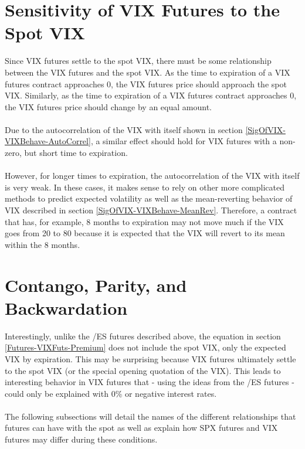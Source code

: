 \documentclass[11pt, oneside]{book}
\begin{document}
\section{Sensitivity of VIX Futures to the Spot VIX} \label{Futures-Sensitivity}
Since VIX futures settle to the spot VIX, there must be some relationship between the VIX futures and the spot VIX. As the time to expiration of a VIX futures contract approaches 0, the VIX futures price should approach the spot VIX. Similarly, as the time to expiration of a VIX futures contract approaches 0, the VIX futures price should change by an equal amount.\\
\\
Due to the autocorrelation of the VIX with itself shown in section \ref{SigOfVIX-VIXBehave-AutoCorrel}, a similar effect should hold for VIX futures with a non-zero, but short time to expiration.\\
\\
However, for longer times to expiration, the autocorrelation of the VIX with itself is very weak. In these cases, it makes sense to rely on other more complicated methods to predict expected volatility as well as the mean-reverting behavior of VIX described in section \ref{SigOfVIX-VIXBehave-MeanRev}. Therefore, a contract that has, for example, 8 months to expiration may not move much if the VIX goes from 20 to 80 because it is expected that the VIX will revert to its mean within the 8 months.

\section{Contango, Parity, and Backwardation} \label{Futures-ConBackPar}
Interestingly, unlike the /ES futures described above, the equation in section \ref{Futures-VIXFuts-Premium} does not include the spot VIX, only the expected VIX by expiration. This may be surprising because VIX futures ultimately settle to the spot VIX (or the special opening quotation of the VIX). This leads to interesting behavior in VIX futures that - using the ideas from the /ES futures - could only be explained with 0\% or negative interest rates. \\
\\
The following subsections will detail the names of the different relationships that futures can have with the spot as well as explain how SPX futures and VIX futures may differ during these conditions.
\end{document}
